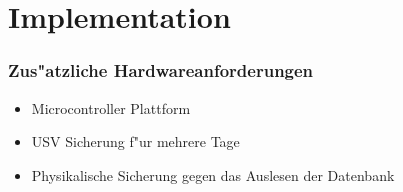 %
%

\section{Implementation}

\begin{frame}
	\frametitle{Zus"atzliche Hardwareanforderungen}
	\begin{itemize}
		\item<2-> Microcontroller Plattform
		\item<3-> USV Sicherung f"ur mehrere Tage
		\item<4-> Physikalische Sicherung gegen das Auslesen der Datenbank
	\end{itemize}
\end{frame}

%
%
%
